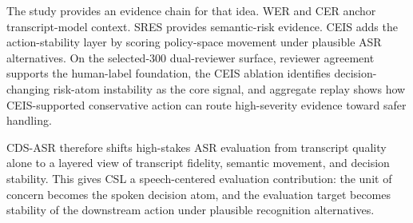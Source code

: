 The study provides an evidence chain for that idea. WER and CER anchor transcript-model context. SRES provides semantic-risk evidence. CEIS adds the action-stability layer by scoring policy-space movement under plausible ASR alternatives. On the selected-300 dual-reviewer surface, reviewer agreement supports the human-label foundation, the CEIS ablation identifies decision-changing risk-atom instability as the core signal, and aggregate replay shows how CEIS-supported conservative action can route high-severity evidence toward safer handling.

CDS-ASR therefore shifts high-stakes ASR evaluation from transcript quality alone to a layered view of transcript fidelity, semantic movement, and decision stability. This gives CSL a speech-centered evaluation contribution: the unit of concern becomes the spoken decision atom, and the evaluation target becomes stability of the downstream action under plausible recognition alternatives.

